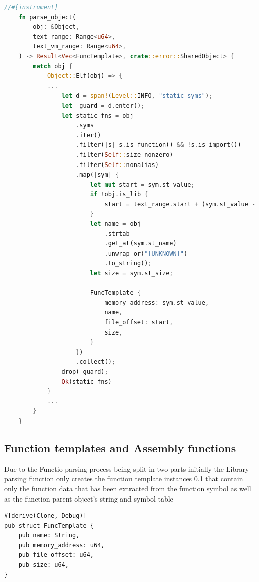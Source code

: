 \begin{lstlisting}[language=Rust]
//#[instrument]
    fn parse_object(
        obj: &Object,
        text_range: Range<u64>,
        text_vm_range: Range<u64>,
    ) -> Result<Vec<FuncTemplate>, crate::error::SharedObject> {
        match obj {
            Object::Elf(obj) => {
            ...
                let d = span!(Level::INFO, "static_syms");
                let _guard = d.enter();
                let static_fns = obj
                    .syms
                    .iter()
                    .filter(|s| s.is_function() && !s.is_import())
                    .filter(Self::size_nonzero)
                    .filter(Self::nonalias)
                    .map(|sym| {
                        let mut start = sym.st_value;
                        if !obj.is_lib {
                            start = text_range.start + (sym.st_value - text_vm_range.start);
                        }
                        let name = obj
                            .strtab
                            .get_at(sym.st_name)
                            .unwrap_or("[UNKNOWN]")
                            .to_string();
                        let size = sym.st_size;

                        FuncTemplate {
                            memory_address: sym.st_value,
                            name,
                            file_offset: start,
                            size,
                        }
                    })
                    .collect();
                drop(_guard);
                Ok(static_fns)
            }
            ...
        }
    }    
\end{lstlisting}

\subsection{Function templates and Assembly functions}

Due to the Functio parsing process being split in two parts initially the Library parsing function only creates the function template instances \ref{} that contain only the function data that has been extracted from the function symbol as well as the function parent object's string and symbol table
\begin{lstlisting}
#[derive(Clone, Debug)]
pub struct FuncTemplate {
    pub name: String,
    pub memory_address: u64,
    pub file_offset: u64,
    pub size: u64,
}
\end{lstlisting}


